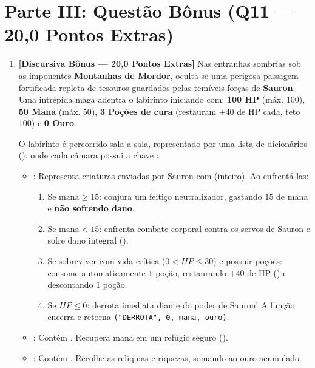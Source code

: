 \ifmostrarGabarito\clearpage\fi

\vspace{-0.2cm}
\section*{\Large Parte III: Questão Bônus (Q11 — 20,0 Pontos Extras)}
\vspace{-0.2cm}

\begin{enumerate}[label=\textbf{Q\arabic*.}, start=11]

\item \textbf{[Discursiva Bônus — 20,0 Pontos Extras]} Nas entranhas sombrias sob as imponentes \textbf{Montanhas de Mordor}, oculta-se uma perigosa passagem fortificada repleta de tesouros guardados pelas temíveis forças de \textbf{Sauron}. Uma intrépida maga adentra o labirinto iniciando com: \textbf{100 HP} (máx. $100$), \textbf{50 Mana} (máx. $50$), \textbf{3 Poções de cura} (restauram $+40$ de HP cada, teto $100$) e \textbf{0 Ouro}.

O labirinto é percorrido sala a sala, representado por uma lista de dicionários (), onde cada câmara possui a chave :
\begin{itemize}[leftmargin=*, noitemsep, topsep=1pt]
    \item {}: Representa criaturas enviadas por Sauron com  (inteiro). Ao enfrentá-las:
    \begin{enumerate}[label=(\alph*), leftmargin=*, noitemsep, topsep=0pt]
        \item Se $\text{mana} \ge 15$: conjura um feitiço neutralizador, gastando $15$ de mana e \textbf{não sofrendo dano}.
        \item Se $\text{mana} < 15$: enfrenta combate corporal contra os servos de Sauron e sofre dano integral ().
        \item Se sobreviver com vida crítica ($0 < HP \le 30$) e possuir poções: consome automaticamente $1$ poção, restaurando $+40$ de HP () e descontando $1$ poção.
        \item Se $HP \le 0$: derrota imediata diante do poder de Sauron! A função encerra e retorna \texttt{("DERROTA", 0, mana, ouro)}.
    \end{enumerate}
    \item {}: Contém . Recupera mana em um refúgio seguro ().
    \item {}: Contém . Recolhe as relíquias e riquezas, somando ao ouro acumulado.
\end{itemize}


\end{enumerate}

